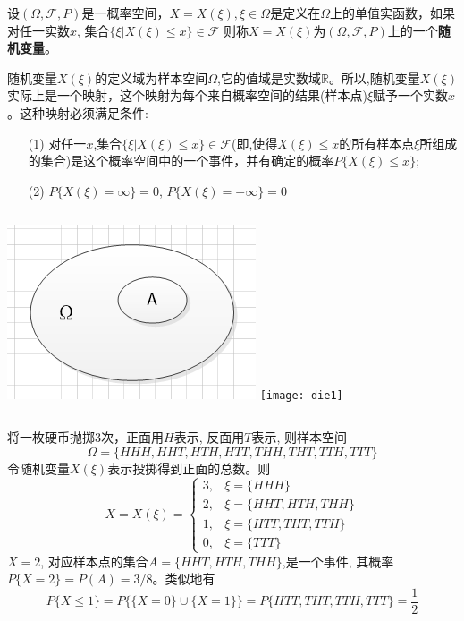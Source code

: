 \begin{frame}
\begin{definition}
	设$(\Omega,\mathcal{F},P)$是一概率空间，$X=X(\xi),\xi\in\Omega$是定义在$\Omega$上的单值实函数，如果对任一实数$x$, 集合$\{\xi|X(\xi)\le x\}\in\mathcal{F}$ 则称$X=X(\xi)$为$(\Omega,\mathcal{F},P)$上的一个\textbf{随机变量}。
	
	随机变量$X(\xi)$的定义域为样本空间$\Omega$,它的值域是实数域$\mathbb{R}$。所以,随机变量$X(\xi)$实际上是一个映射，这个映射为每个来自概率空间的结果(样本点)$\xi$赋予一个实数$x$。这种映射必须满足条件:
	\begin{itemize}
		\item[(1)] 对任一$x$,集合$\{\xi|X(\xi)\le x\}\in\mathcal{F}$(即,使得$X(\xi)\le x$的所有样本点$\xi$所组成的集合)是这个概率空间中的一个事件，并有确定的概率$P\{X(\xi)\le x\}$;
		\item[(2)] $P\{X(\xi)=\infty \}=0$, $P\{X(\xi)=-\infty \}=0$
	\end{itemize}
\end{definition}
\begin{columns}
	\includegraphics[scale=0.2]{geometry}
	\texttt{[image: die1]}
\end{columns}
\end{frame}

\begin{frame}
\begin{example}
	将一枚硬币抛掷3次，正面用$H$表示, 反面用$T$表示, 则样本空间
	\[\Omega=\{HHH,HHT,HTH,HTT,THH,THT,TTH,TTT\} \]
	令随机变量$X(\xi)$表示投掷得到正面的总数。则
	\[ 
		X=X(\xi)=
		\begin{cases}
		3, &\xi=\{HHH\}\\
		2, &\xi=\{HHT,HTH,THH\}\\
		1, &\xi=\{HTT,THT,TTH\}\\
		0, &\xi=\{TTT\}
		\end{cases}
	\]
	$X=2$, 对应样本点的集合$A=\{HHT,HTH,THH\}$,是一个事件, 其概率$P\{X=2\}=P(A)=3/8$。类似地有
	\[ P\{X\le 1\}=P\{\{X=0\}\cup\{X=1\}\}=P\{HTT,THT,TTH,TTT\}=\frac{1}{2} \]
\end{example}
\end{frame}

